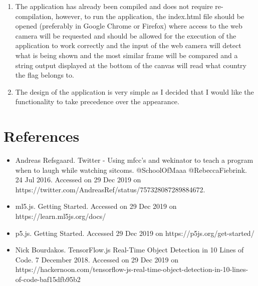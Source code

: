 \documentclass{report}
\begin{document}
\begin{enumerate}
	\item The application has already been compiled and does not require re-compilation, however, to run the application, the index.html file should be opened (preferably in Google Chrome or Firefox) where access to the web camera will be requested and should be allowed for the execution of the application to work correctly and the input of the web camera will detect what is being shown and the most similar frame will be compared and a string output displayed at the bottom of the canvas will read what country the flag belongs to.
	\item The design of the application is very simple as I decided that I would like the functionality to take precedence over the appearance.
\end{enumerate}

\section*{References}
\begin{itemize}
	\item Andreas Refsgaard. Twitter - Using mfcc's and wekinator to teach a program when to laugh while watching sitcoms. @SchoolOfMaaa @RebeccaFiebrink. 24 Jul 2016. Accessed on 29 Dec 2019 on \\https://twitter.com/AndreasRef/status/757328087289884672.
	\item ml5.js. Getting Started. Accessed on 29 Dec 2019 on https://learn.ml5js.org/docs/
	\item p5.js. Getting Started. Accessed 29 Dec 2019 on https://p5js.org/get-started/
	\item Nick Bourdakos. TensorFlow.js Real-Time Object Detection in 10 Lines of Code. 7 December 2018. Accessed on 29 Dec 2019 on https://hackernoon.com/tensorflow-js-real-time-object-detection-in-10-lines-of-code-baf15dfb95b2
\end{itemize}
\end{document}

